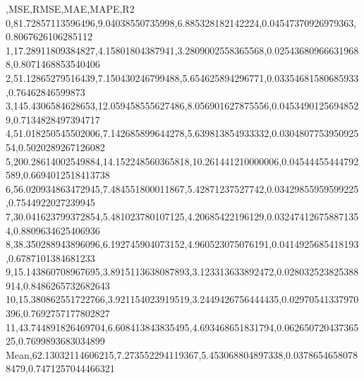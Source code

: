 ,MSE,RMSE,MAE,MAPE,R2
0,81.72857113596496,9.04038550735998,6.885328182142224,0.04547370926979363,0.8067626106285112
1,17.28911809384827,4.15801804387941,3.2809002558365568,0.025436809666319688,0.8071468853540406
2,51.12865279516439,7.150430246799488,5.654625894296771,0.03354681580685933,0.76462846599873
3,145.4306584628653,12.059458555627486,8.056901627875556,0.04534901256948529,0.7134828497394717
4,51.018250545502006,7.142685899644278,5.639813854933332,0.030480775395092554,0.5020289267126082
5,200.28614002549884,14.152248560365818,10.261441210000006,0.04544455444792589,0.6694012518413738
6,56.020934863472945,7.484551800011867,5.42871237527742,0.03429855959599225,0.7544922027239945
7,30.041623799372854,5.481023780107125,4.20685422196129,0.032474126758871354,0.8809634625406936
8,38.350288943896096,6.192745904073152,4.960523075076191,0.0414925685418193,0.6787101384681233
9,15.143860708967695,3.8915113638087893,3.123313633892472,0.028032523825388914,0.8486265732682643
10,15.380862551722766,3.921154023919519,3.2449426756444435,0.02970541337970396,0.7692757177802827
11,43.744891826469704,6.608413843835495,4.693468651831794,0.06265072043736525,0.7699893683034899
Mean,62.13032114606215,7.273552294119367,5.453068804897338,0.03786546580788479,0.7471257044466321
